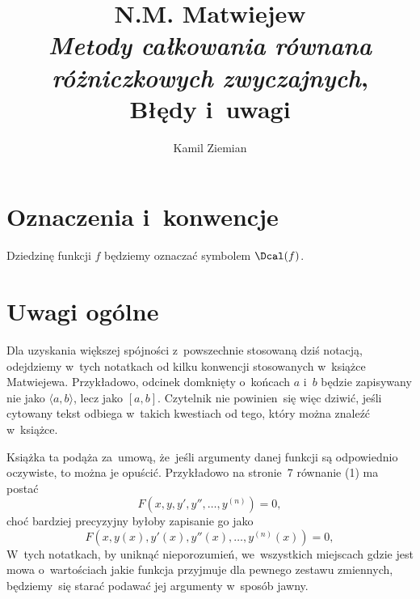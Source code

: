 \documentclass[a4paper,11pt]{article}
\title{N.M. Matwiejew \\
  \textit{Metody całkowania równana różniczkowych zwyczajnych},
  \cite{MatwiejewMetodyCalkowaniaRownanRozniczkowychZwyczajnych1986} \\
  {\Large Błędy i~uwagi}}
\author{Kamil Ziemian}
\numberwithin{equation}{section}
\begin{document}





\maketitle





\section{Oznaczenia i~konwencje}

\label{sec:Oznaczenia-i-konwencje}



\noindent
Dziedzinę funkcji $f$ będziemy oznaczać symbolem $\Dcal( f )$.

\VerSpaceFour










\section{Uwagi ogólne}

\label{sec:Uwagi-ogolne}


\noindent
Dla uzyskania większej spójności z~powszechnie stosowaną dziś notacją,
odejdziemy w~tych notatkach od kilku konwencji stosowanych w~książce
Matwiejewa. Przykładowo, odcinek domknięty o~końcach $a$ i~$b$ będzie
zapisywany nie jako $\langle a, b \rangle$, lecz jako $[ a, b ]$. Czytelnik nie
powinien~się więc dziwić, jeśli cytowany tekst odbiega w~takich kwestiach
od tego, który można znaleźć w~książce.

\VerSpaceFour





\noindent
Książka ta podąża za~umową, że~jeśli argumenty danej funkcji są
odpowiednio oczywiste, to można je opuścić. Przykładowo na stronie~7
równanie (1) ma postać
\begin{equation}
  \label{eq:Uwagi-ogolne-01}
  F\left( x, y, y', y'', \ldots, y^{ ( n ) } \right) = 0,
\end{equation}
choć bardziej precyzyjny byłoby zapisanie go jako
\begin{equation}
  \label{eq:Uwagi-ogolne-02}
  F\left( x, y( x ), y'( x ), y''( x ), \ldots, y^{ ( n ) }( x ) \right) = 0,
\end{equation}
W~tych notatkach, by uniknąć nieporozumień, we~wszystkich miejscach gdzie
jest mowa o~wartościach jakie funkcja przyjmuje dla pewnego zestawu
zmiennych, będziemy~się starać podawać jej argumenty w~sposób jawny.
\end{document}
